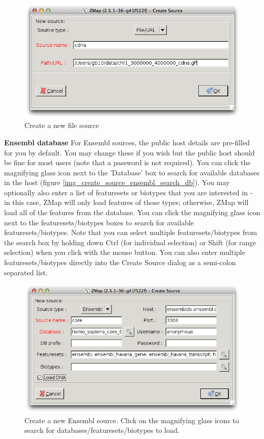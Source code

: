 \documentclass[letterpaper]{article}
\begin{document}
\begin{figure}
\centering
\color[rgb]{0.30980393,0.5058824,0.7411765}
\includegraphics[resolution=150]{img_create_source_file.png}
\caption{Create a new file source}
\label{img_create_source_file}
\end{figure}

\textbf{Ensembl database}
For Ensembl sources, the public host details are pre-filled for you by default. You may change these if you wish but the public host should be fine for most users (note that a password is not required). You can click the magnifying glass icon next to the 'Database' box to search for available databases in the host (figure \ref{img_create_source_ensembl_search_db}). You may optionally also enter a list of featuresets or biotypes that you are interested in - in this case, ZMap will only load features of those types; otherwise, ZMap will load all of the features from the database. You can click the magnifying glass icon next to the featuresets/biotypes boxes to search for available featuresets/biotypes. Note that you can select multiple featuresets/biotypes from the search box by holding down Ctrl (for individual selection) or Shift (for range selection) when you click with the mouse button. You can also enter multiple featuresets/biotypes directly into the Create Source dialog as a semi-colon separated list.

\begin{figure}
\centering
\color[rgb]{0.30980393,0.5058824,0.7411765}
\includegraphics[resolution=150]{img_create_source_ensembl.png}
\caption{Create a new Ensembl source. Click on the magnifying glass icons to search for databases/featuresets/biotypes to load.}
\label{img_create_source_ensembl}
\end{figure}
\end{document}
